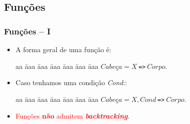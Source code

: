 \subsection{Funções}

\begin{frame}[fragile]
	\frametitle{Funções -- I}
    
    \begin{itemize}
        \item A forma geral de uma função é:
        
        \begin{tabbing}
          aa \= aaa \= aaa \= aaa \= aaa \= aaa \= aaa \kill
          \> \> $Cabe$ç$a = X \ $\verb+=>+$\ Corpo$. 
        \end{tabbing}

       \pause        
        \item Caso tenhamos uma condição \emph{Cond}::
        
        \begin{tabbing}
          aa \= aaa \= aaa \= aaa \= aaa \= aaa \= aaa \kill
          \> \> $Cabe$ç$a = X , Cond \ $\verb+=>+$\ Corpo$. 
        \end{tabbing}
        
        \item \textcolor{red}{Funções \textbf{não} admitem \textbf{\textit{backtracking}}}.
    \end{itemize}
\end{frame}
    
